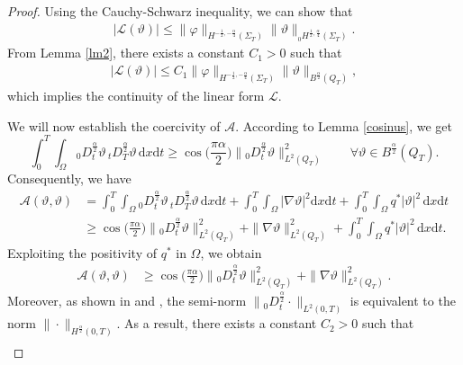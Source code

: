\documentclass[a4paper,12pt,reqno,natbib]{amsart}
\newcommand{\dx} {\displaystyle\mathrm{d}x}
\newcommand{\dt} {\displaystyle\mathrm{d}t}
\begin{document}
\begin{proof} 
Using the Cauchy-Schwarz inequality, we can show that
\begin{align*}
    \Big|\mathcal{L}(\vartheta) \Big| \leq \| \varphi \|_{H^{-\frac{1}{2}, -\frac{\alpha}{4} }(\Sigma_T)} \| \vartheta \|_{{}_0H^{\frac{1}{2}, \frac{\alpha}{4} }(\Sigma_T)} .
\end{align*}
From Lemma \ref{lm2}, there exists a constant $C_1>0$ such that
\begin{align} \label{estimate_L}
    \Big|\mathcal{L}(\vartheta) \Big| \leq C_1\| \varphi \|_{H^{-\frac{1}{2}, -\frac{\alpha}{4} }(\Sigma_T)} \| \vartheta \|_{B^{\frac{\alpha}{2}}(Q_T)},
\end{align}
which implies the continuity of the linear form $\mathcal{L}.$ 

We will now establish the coercivity of $\mathcal{A}.$ According to Lemma \ref{cosinus}, we get
\begin{equation*}%
    \int_0^T\int_{\Omega}{}_0D^{\frac{\alpha}{2}}_t \vartheta\, {}_tD^{\frac{\alpha}{2}}_T\vartheta\,\dx\dt\geq \cos\Big( \displaystyle\frac{\pi\alpha}{2} \Big)\|{}_0D^{\frac{\alpha}{2}}_t\vartheta\|_{L^2(Q_T)}^2\qquad \forall\vartheta\in B^{\frac{\alpha}{2}}(Q_T).
\end{equation*}
Consequently, we have
\begin{align*}
    \mathcal{A}(\vartheta,\vartheta)&=\int_0^T\int_{\Omega}{}_0D^{\frac{\alpha}{2}}_t \vartheta\, {}_tD^{\frac{\alpha}{2}}_T\vartheta\,\dx\dt +\int_0^T\int_{\Omega}\Big|\nabla \vartheta\Big|^2\dx\dt +\int_0^T\int_{\Omega} q^*\Big|\vartheta\Big|^2\, \dx \dt\\
    &\geq \cos\Big( \displaystyle\frac{\pi\alpha}{2} \Big)\|{}_0D^{\frac{\alpha}{2}}_t\vartheta\|_{L^2(Q_T)}^2+\|\nabla\vartheta\|_{L^2(Q_T)}^2+\int_0^T\int_{\Omega} q^*\Big|\vartheta\Big|^2\, \dx \dt.
\end{align*}
Exploiting the positivity of $q^*$ in $\Omega$, we obtain
\begin{align*}
    \mathcal{A}(\vartheta,\vartheta)
    &\geq \cos\Big( \displaystyle\frac{\pi\alpha}{2} \Big)\|{}_0D^{\frac{\alpha}{2}}_t\vartheta\|_{L^2(Q_T)}^2+\|\nabla\vartheta\|_{L^2(Q_T)}^2.
\end{align*}
Moreover, as shown in \cite[Lemma 2.4]{li2009space} and \cite[Lemma 2.5]{li2009space}, the semi-norm $\|{}_0D^{\frac{\alpha}{2}}_t  \cdot \|_{L^2(0,T)}$ is equivalent to the norm $\|\cdot \|_{H^{\frac{\alpha}{2}}(0,T)}.$ As a result, there exists a constant $C_2>0$ such that
\begin{align*}

\end{align*}
\end{proof}
\end{document}
